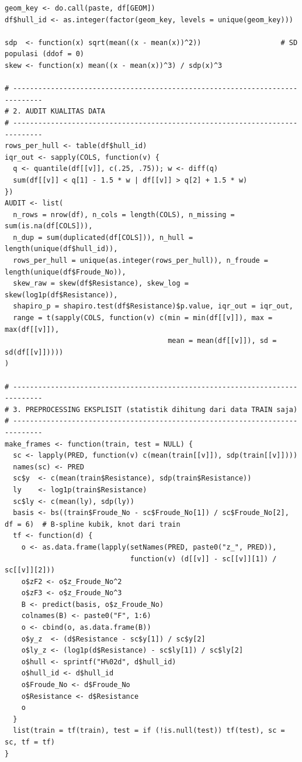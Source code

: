 \documentclass[
]{article}
\begin{document}
\begin{verbatim}
geom_key <- do.call(paste, df[GEOM])
df$hull_id <- as.integer(factor(geom_key, levels = unique(geom_key)))

sdp  <- function(x) sqrt(mean((x - mean(x))^2))                   # SD populasi (ddof = 0)
skew <- function(x) mean((x - mean(x))^3) / sdp(x)^3

# -----------------------------------------------------------------------------
# 2. AUDIT KUALITAS DATA
# -----------------------------------------------------------------------------
rows_per_hull <- table(df$hull_id)
iqr_out <- sapply(COLS, function(v) {
  q <- quantile(df[[v]], c(.25, .75)); w <- diff(q)
  sum(df[[v]] < q[1] - 1.5 * w | df[[v]] > q[2] + 1.5 * w)
})
AUDIT <- list(
  n_rows = nrow(df), n_cols = length(COLS), n_missing = sum(is.na(df[COLS])),
  n_dup = sum(duplicated(df[COLS])), n_hull = length(unique(df$hull_id)),
  rows_per_hull = unique(as.integer(rows_per_hull)), n_froude = length(unique(df$Froude_No)),
  skew_raw = skew(df$Resistance), skew_log = skew(log1p(df$Resistance)),
  shapiro_p = shapiro.test(df$Resistance)$p.value, iqr_out = iqr_out,
  range = t(sapply(COLS, function(v) c(min = min(df[[v]]), max = max(df[[v]]),
                                       mean = mean(df[[v]]), sd = sd(df[[v]]))))
)

# -----------------------------------------------------------------------------
# 3. PREPROCESSING EKSPLISIT (statistik dihitung dari data TRAIN saja)
# -----------------------------------------------------------------------------
make_frames <- function(train, test = NULL) {
  sc <- lapply(PRED, function(v) c(mean(train[[v]]), sdp(train[[v]])))
  names(sc) <- PRED
  sc$y  <- c(mean(train$Resistance), sdp(train$Resistance))
  ly    <- log1p(train$Resistance)
  sc$ly <- c(mean(ly), sdp(ly))
  basis <- bs((train$Froude_No - sc$Froude_No[1]) / sc$Froude_No[2], df = 6)  # B-spline kubik, knot dari train
  tf <- function(d) {
    o <- as.data.frame(lapply(setNames(PRED, paste0("z_", PRED)),
                              function(v) (d[[v]] - sc[[v]][1]) / sc[[v]][2]))
    o$zF2 <- o$z_Froude_No^2
    o$zF3 <- o$z_Froude_No^3
    B <- predict(basis, o$z_Froude_No)
    colnames(B) <- paste0("F", 1:6)
    o <- cbind(o, as.data.frame(B))
    o$y_z  <- (d$Resistance - sc$y[1]) / sc$y[2]
    o$ly_z <- (log1p(d$Resistance) - sc$ly[1]) / sc$ly[2]
    o$hull <- sprintf("H%02d", d$hull_id)
    o$hull_id <- d$hull_id
    o$Froude_No <- d$Froude_No
    o$Resistance <- d$Resistance
    o
  }
  list(train = tf(train), test = if (!is.null(test)) tf(test), sc = sc, tf = tf)
}


\end{verbatim}
\end{document}
